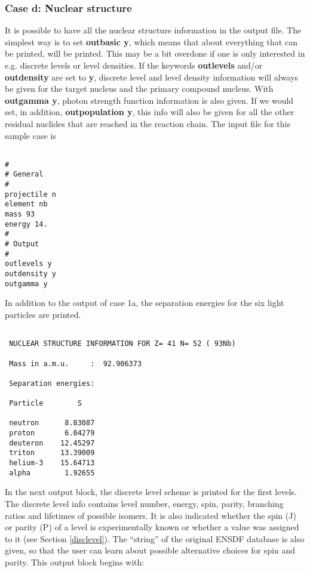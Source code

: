 \begin{samplecase}
\subsubsection{Case d: Nuclear structure}    
It is possible to have all the nuclear structure information in the output file.
The simplest way is to set {\bf outbasic y}, which means that about everything 
that can be printed, will be printed. This may be a bit overdone if one
is only interested in e.g. discrete levels or level densities. If the 
keywords {\bf outlevels} and/or {\bf outdensity} are set to {\bf y}, 
discrete level and level density information will always be given for the 
target nucleus and the primary compound nucleus. With {\bf outgamma y}, photon
strength function information is also given. If we would set, in addition,
{\bf outpopulation y}, this info will also be given for all the other residual 
nuclides that are reached in the reaction chain. 
The input file for this sample case is

{\small \begin{verbatim}

#
# General
#
projectile n
element nb
mass 93
energy 14.
#
# Output
#
outlevels y
outdensity y
outgamma y
\end{verbatim} } \renewcommand{\baselinestretch}{1.07}\small\normalsize
\noindent
In addition to the output of case 1a,
the separation energies for the six light particles are printed. 

{\small \begin{verbatim}

 NUCLEAR STRUCTURE INFORMATION FOR Z= 41 N= 52 ( 93Nb)

 Mass in a.m.u.     :  92.906373

 Separation energies:

 Particle        S

 neutron      8.83087
 proton       6.04279
 deuteron    12.45297
 triton      13.39009
 helium-3    15.64713
 alpha        1.92655
\end{verbatim} } \renewcommand{\baselinestretch}{1.07}\small\normalsize
\noindent
In the next output block,
the discrete level scheme is printed for the first levels. 
The discrete level info contains level number, energy, spin, parity, branching 
ratios and lifetimes of possible isomers. It is also indicated whether the 
spin (J) or parity (P) of a level is experimentally known or whether a value 
was assigned to it (see Section \ref{disclevel}). The ``string'' of the 
original ENSDF database is also given, so that the user can learn about 
possible alternative choices for spin and parity. This output block begins with:


\end{samplecase}
